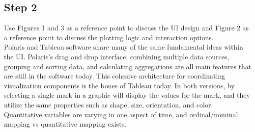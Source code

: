 \documentclass{neu_handout}
\begin{document}
\subsection*{Step 2}
Use Figures 1 and 3 as a reference point to discuss the UI design and Figure 2
as a reference point to discuss the plotting logic and interaction options.\\

Polaris and Tableau software share many of the same fundamental ideas within the UI. Polaris's drag and drop interface, combining multiple data sources, grouping and sorting data, and calculating aggregations are all main features that are still in the software today. This cohesive architecture for coordinating visualization components is the bones of Tableau today. In both versions, by selecting a single mark in a graphic will display the values for the mark, and they utilize the same properties such as shape, size, orientation, and color. Quantitative variables are varying in one aspect of time, and ordinal/nominal mapping vs quantitative mapping exists.
\end{document}
